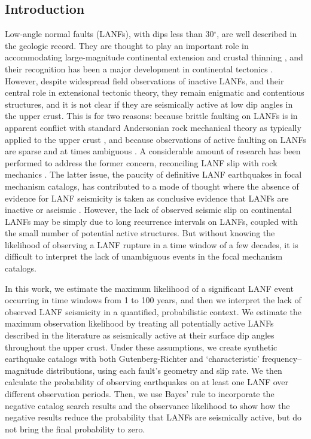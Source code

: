 \documentclass[twocolumn,grl]{AGUTeX}
\begin{document}
\begin{article}

\section{Introduction}
Low-angle normal faults (LANFs), with dips less than 30$^\circ$, are
well described in the geologic record. They are thought to play
an important role in accommodating large-magnitude continental
extension \citep{howard1987crustal} and crustal thinning
\citep{lister1986detachment}, and their recognition has been a major
development in continental tectonics 
\citep{wernicke2009detachment}. However, despite widespread
field observations of inactive LANFs, and their central role in
extensional tectonic theory, they remain enigmatic and contentious
structures, and it is not clear if they are seismically active at low dip 
angles in the upper crust. This is for two reasons: because brittle faulting
on LANFs is in apparent conflict with standard Andersonian rock mechanical
theory as typically applied to the upper crust
\citep{axen2004lanfmech}, and because observations of active faulting
on LANFs are sparse and at times ambiguous \citep{wernicke1995seis}. A
considerable amount of research has been performed to address the
former concern, reconciling LANF slip with rock mechanics \citep [e.g.,]
[]{axenbartley1997, collettini2011lanfmech}. The latter issue, the paucity of 
definitive LANF earthquakes in focal mechanism catalogs, has contributed 
to a mode of thought where the  absence of evidence for LANF seismicity is 
taken as conclusive evidence that LANFs are inactive or aseismic
\citep{jackson1987, collettinisibson2001}. However, the lack of observed 
seismic slip on continental LANFs may be simply due to long recurrence
intervals on LANFs, coupled with the small number of potential active
structures.  But without knowing the likelihood of observing a LANF rupture in
a time window of a few decades, it is difficult to interpret the lack of
unambiguous events in the focal mechanism catalogs.

In this work, we estimate the maximum likelihood of a significant LANF event
occurring in time windows from 1 to 100 years, and then we interpret the lack
of observed LANF seismicity in a quantified,
probabilistic context. We estimate the maximum observation likelihood by
treating all potentially active LANFs described in the 
literature as seismically active at their surface dip angles 
throughout the upper crust. Under these assumptions, we create synthetic
earthquake catalogs with both Gutenberg-Richter and `characteristic'
frequency--magnitude distributions, using each fault's geometry and slip rate.
We then calculate the probability of observing earthquakes on at least one LANF
over different observation periods. Then, we use Bayes' rule to incorporate
the negative catalog search results and the observance likelihood to show how
the negative results reduce the probability that LANFs are seismically active,
but do not bring the final probability to zero.



\end{article}
\end{document}

